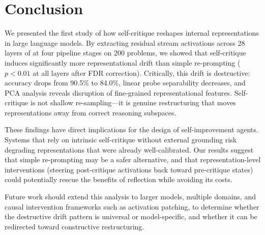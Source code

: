 \section{Conclusion}
\label{sec:conclusion}

We presented the first study of how self-critique reshapes internal representations in large language models. By extracting residual stream activations across 28 layers of \qwen at four pipeline stages on 200 \gsmk problems, we showed that self-critique induces significantly more representational drift than simple re-prompting ($p < 0.01$ at all layers after FDR correction). Critically, this drift is destructive: accuracy drops from 90.5\% to 84.0\%, linear probe separability decreases, and PCA analysis reveals disruption of fine-grained representational features. Self-critique is not shallow re-sampling---it is genuine restructuring that moves representations away from correct reasoning subspaces.

These findings have direct implications for the design of self-improvement agents. Systems that rely on intrinsic self-critique without external grounding risk degrading representations that were already well-calibrated. Our results suggest that simple re-prompting may be a safer alternative, and that representation-level interventions (\eg steering post-critique activations back toward pre-critique states) could potentially rescue the benefits of reflection while avoiding its costs.

Future work should extend this analysis to larger models, multiple domains, and causal intervention frameworks such as activation patching, to determine whether the destructive drift pattern is universal or model-specific, and whether it can be redirected toward constructive restructuring.
